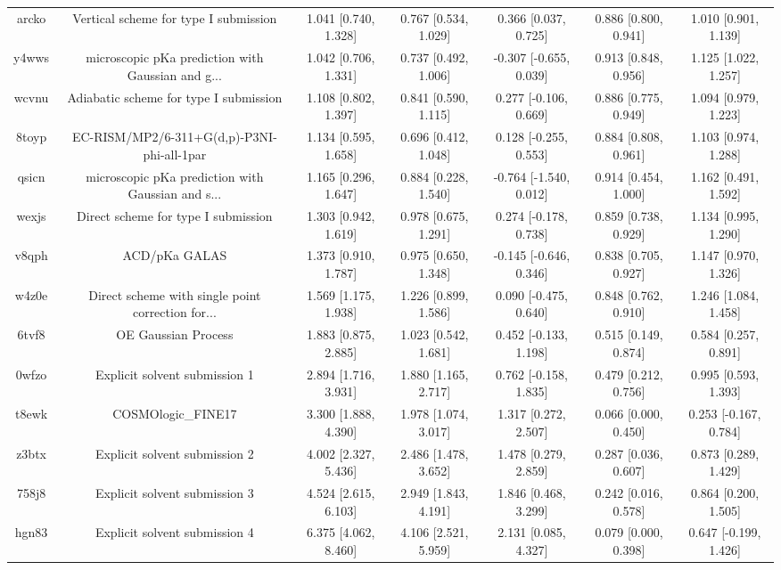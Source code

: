 \documentclass{article}
\begin{document}
\begin{center}
\begin{longtable}{|ccccccc|}
 arcko &              Vertical scheme for type I submission &  1.041 [0.740, 1.328] &  0.767 [0.534, 1.029] &     0.366 [0.037, 0.725] &  0.886 [0.800, 0.941] &   1.010 [0.901, 1.139] \\
 y4wws &  microscopic pKa prediction with Gaussian and g... &  1.042 [0.706, 1.331] &  0.737 [0.492, 1.006] &   -0.307 [-0.655, 0.039] &  0.913 [0.848, 0.956] &   1.125 [1.022, 1.257] \\
 wcvnu &             Adiabatic scheme for type I submission &  1.108 [0.802, 1.397] &  0.841 [0.590, 1.115] &    0.277 [-0.106, 0.669] &  0.886 [0.775, 0.949] &   1.094 [0.979, 1.223] \\
 8toyp &         EC-RISM/MP2/6-311+G(d,p)-P3NI-phi-all-1par &  1.134 [0.595, 1.658] &  0.696 [0.412, 1.048] &    0.128 [-0.255, 0.553] &  0.884 [0.808, 0.961] &   1.103 [0.974, 1.288] \\
 qsicn &  microscopic pKa prediction with Gaussian and s... &  1.165 [0.296, 1.647] &  0.884 [0.228, 1.540] &   -0.764 [-1.540, 0.012] &  0.914 [0.454, 1.000] &   1.162 [0.491, 1.592] \\
 wexjs &                Direct scheme for type I submission &  1.303 [0.942, 1.619] &  0.978 [0.675, 1.291] &    0.274 [-0.178, 0.738] &  0.859 [0.738, 0.929] &   1.134 [0.995, 1.290] \\
 v8qph &                                      ACD/pKa GALAS &  1.373 [0.910, 1.787] &  0.975 [0.650, 1.348] &   -0.145 [-0.646, 0.346] &  0.838 [0.705, 0.927] &   1.147 [0.970, 1.326] \\
 w4z0e &  Direct scheme with single point correction for... &  1.569 [1.175, 1.938] &  1.226 [0.899, 1.586] &    0.090 [-0.475, 0.640] &  0.848 [0.762, 0.910] &   1.246 [1.084, 1.458] \\
 6tvf8 &                                OE Gaussian Process &  1.883 [0.875, 2.885] &  1.023 [0.542, 1.681] &    0.452 [-0.133, 1.198] &  0.515 [0.149, 0.874] &   0.584 [0.257, 0.891] \\
 0wfzo &                      Explicit solvent submission 1 &  2.894 [1.716, 3.931] &  1.880 [1.165, 2.717] &    0.762 [-0.158, 1.835] &  0.479 [0.212, 0.756] &   0.995 [0.593, 1.393] \\
 t8ewk &                                 COSMOlogic\_FINE17 &  3.300 [1.888, 4.390] &  1.978 [1.074, 3.017] &     1.317 [0.272, 2.507] &  0.066 [0.000, 0.450] &  0.253 [-0.167, 0.784] \\
 z3btx &                      Explicit solvent submission 2 &  4.002 [2.327, 5.436] &  2.486 [1.478, 3.652] &     1.478 [0.279, 2.859] &  0.287 [0.036, 0.607] &   0.873 [0.289, 1.429] \\
 758j8 &                      Explicit solvent submission 3 &  4.524 [2.615, 6.103] &  2.949 [1.843, 4.191] &     1.846 [0.468, 3.299] &  0.242 [0.016, 0.578] &   0.864 [0.200, 1.505] \\
 hgn83 &                      Explicit solvent submission 4 &  6.375 [4.062, 8.460] &  4.106 [2.521, 5.959] &     2.131 [0.085, 4.327] &  0.079 [0.000, 0.398] &  0.647 [-0.199, 1.426] \\
\end{longtable}
\end{center}
\end{document}
